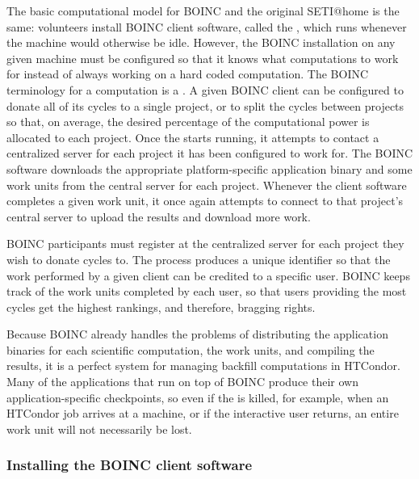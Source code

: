 The basic computational model for BOINC and the original SETI@home is
the same: volunteers install BOINC client software,
called the ,
which runs whenever the machine would otherwise be idle.
However, the BOINC installation on any given machine must be
configured so that it knows what computations to work for
instead of always working on a hard coded computation.
The BOINC terminology for a computation is a .
A given BOINC client can be configured to donate all of its cycles to
a single project, or to split the cycles between projects so that, on
average, the desired percentage of the computational power is
allocated to each project.
Once the  starts running, 
it attempts to contact a centralized server for
each project it has been configured to work for.
The BOINC software downloads the appropriate platform-specific
application binary and some work units from the central server for
each project.
Whenever the client software completes a given work unit, it once
again attempts to connect to that project's central server to upload
the results and download more work.

BOINC participants must register at the centralized server for each
project they wish to donate cycles to.
The process produces a unique identifier so that the work performed by
a given client can be credited to a specific user.
BOINC keeps track of the work units completed by each user, so that
users providing the most cycles get the highest rankings, 
and therefore, bragging rights.

Because BOINC already handles the problems of distributing the
application binaries for each scientific computation, the work units,
and compiling the results, it is a perfect system for managing
backfill computations in HTCondor.
Many of the applications that run on top of BOINC produce their own
application-specific checkpoints, so even if the
 is killed, 
for example, when an HTCondor job arrives
at a machine, or if the interactive user returns,
an entire work unit will not necessarily be lost.


\subsubsection{\label{sec:Backfill-BOINC-install}Installing the BOINC client
software}


